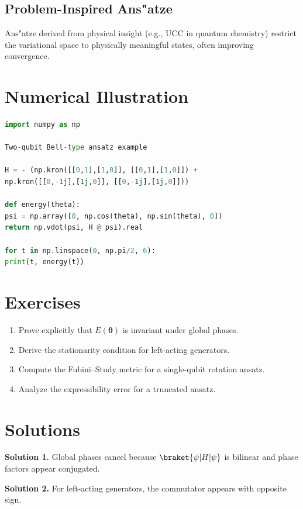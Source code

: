 \documentclass{book}
\begin{document}
\subsection{Problem-Inspired Ans"atze}

Ans"atze derived from physical insight (e.g., UCC in quantum chemistry) restrict the variational space to physically meaningful states, often improving convergence.

\section{Numerical Illustration}

\begin{lstlisting}[language=Python]
import numpy as np

Two-qubit Bell-type ansatz example

H = - (np.kron([[0,1],[1,0]], [[0,1],[1,0]]) +
np.kron([[0,-1j],[1j,0]], [[0,-1j],[1j,0]]))

def energy(theta):
psi = np.array([0, np.cos(theta), np.sin(theta), 0])
return np.vdot(psi, H @ psi).real

for t in np.linspace(0, np.pi/2, 6):
print(t, energy(t))
\end{lstlisting}

\section{Exercises}

\begin{enumerate}
\item Prove explicitly that $E(\bm\theta)$ is invariant under global phases.
\item Derive the stationarity condition for left-acting generators.
\item Compute the Fubini--Study metric for a single-qubit rotation ansatz.
\item Analyze the expressibility error for a truncated ansatz.
\end{enumerate}

\section{Solutions}

\textbf{Solution 1.} Global phases cancel because $\braket{\psi|H|\psi}$ is bilinear and phase factors appear conjugated.

\textbf{Solution 2.} For left-acting generators, the commutator appears with opposite sign.
\end{document}
